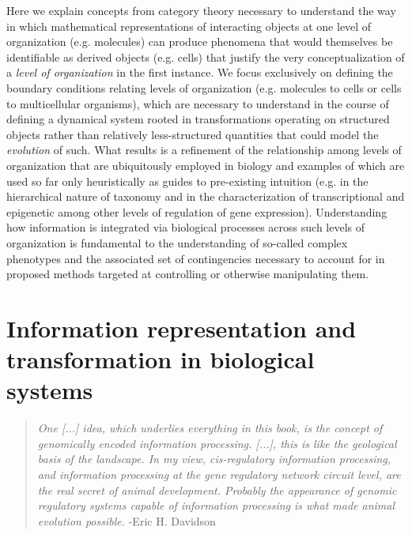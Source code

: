 \documentclass[aps,twocolumn]{revtex4-1}
\begin{document}
Here we explain concepts from category theory necessary to understand the way in which mathematical representations of interacting objects at one level of organization (e.g. molecules) can produce phenomena that would themselves be identifiable as derived objects (e.g. cells) that justify the very conceptualization of a \emph{level of organization} in the first instance. We focus exclusively on defining the boundary conditions relating levels of organization (e.g. molecules to cells or cells to multicellular organisms), which are necessary to understand in the course of defining a dynamical system rooted in transformations operating on structured objects rather than relatively less-structured quantities that could model the \emph{evolution} of such. What results is a refinement of the relationship among levels of organization that are ubiquitously employed in biology and examples of which are used so far only heuristically as guides to pre-existing intuition (e.g. in the hierarchical nature of taxonomy and in the characterization of transcriptional and epigenetic among other levels of regulation of gene expression). Understanding how information is integrated via biological processes across such levels of organization is fundamental to the understanding of so-called complex phenotypes and the associated set of contingencies necessary to account for in proposed methods targeted at controlling or otherwise manipulating them.

\section{Information representation and transformation in biological systems}

\begin{quotation}
{\it One [...] idea, which underlies everything in this book, is the concept
of genomically encoded information processing. [...],
this is like the geological basis of the landscape. In my view, cis-regulatory information processing, and information processing at the gene regulatory network circuit level, are the real secret of animal development. Probably the appearance of genomic regulatory systems capable of information processing is what made animal evolution possible.} -Eric H. Davidson \cite{Davidson2006a}
\end{quotation}
\end{document}
